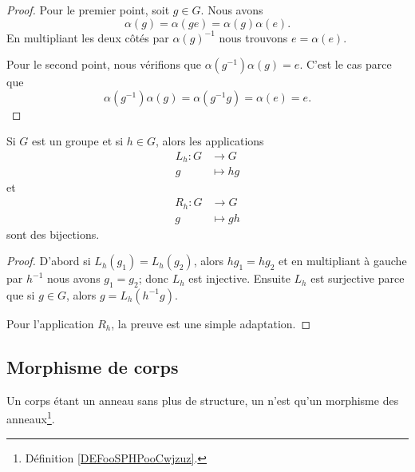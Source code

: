 \begin{proof}
	Pour le premier point, soit \( g\in G\). Nous avons
	\begin{equation}
		\alpha(g)=\alpha(ge)=\alpha(g)\alpha(e).
	\end{equation}
	En multipliant les deux côtés par \( \alpha(g)^{-1}\) nous trouvons \( e=\alpha(e)\).

	Pour le second point, nous vérifions que \( \alpha(g^{-1})\alpha(g)=e\). C'est le cas parce que
	\begin{equation}
		\alpha(g^{-1})\alpha(g)=\alpha(g^{-1}g)=\alpha(e)=e.
	\end{equation}
\end{proof}

\begin{lemma}       \label{LEMooBIBFooBHxFYC}
	Si \( G\) est un groupe et si \( h\in G\), alors les applications
	\begin{equation}
		\begin{aligned}
			L_h\colon G & \to G      \\
			g           & \mapsto hg
		\end{aligned}
	\end{equation}
	et
	\begin{equation}
		\begin{aligned}
			R_h\colon G & \to G      \\
			g           & \mapsto gh
		\end{aligned}
	\end{equation}
	sont des bijections.
\end{lemma}

\begin{proof}
	D'abord si \( L_h(g_1)=L_h(g_2)\), alors \( hg_1=hg_2\) et en multipliant à gauche par \( h^{-1}\) nous avons \( g_1=g_2\); donc \( L_h\) est injective. Ensuite \( L_h\) est surjective parce que si \( g\in G\), alors \( g=L_h(h^{-1} g)\).

	Pour l'application \( R_h\), la preuve est une simple adaptation.
\end{proof}

\subsection{Morphisme de corps}

\begin{definition}		\label{DEFooWGKFooJaakjf}
	Un corps étant un anneau sans plus de structure, un  n'est qu'un morphisme des anneaux\footnote{Définition \ref{DEFooSPHPooCwjzuz}.}.
\end{definition}

